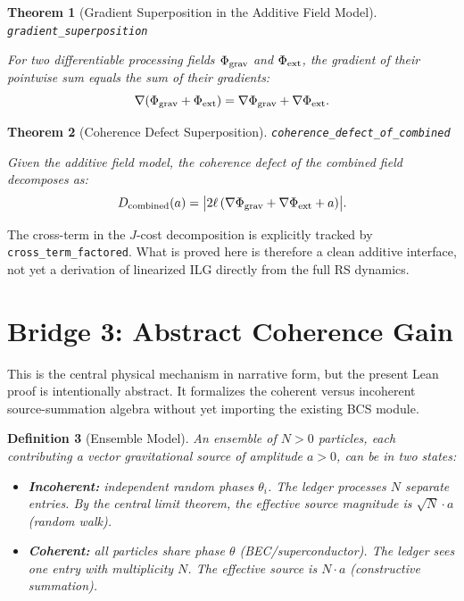 \documentclass[11pt,a4paper]{article}
\newtheorem{theorem}{Theorem}[section]
\newtheorem{definition}[theorem]{Definition}
\newcommand{\lean}[1]{\texttt{\small #1}}
\begin{document}
\begin{theorem}[Gradient Superposition in the Additive Field Model]
\label{thm:gap2}
\lean{gradient\_superposition}

For two differentiable processing fields $\Phi_{\rm grav}$ and $\Phi_{\rm ext}$, the gradient of their pointwise sum equals the sum of their gradients:
\begin{equation}
    \nabla(\Phi_{\rm grav} + \Phi_{\rm ext}) = \nabla\Phi_{\rm grav} + \nabla\Phi_{\rm ext}.
\end{equation}
\end{theorem}

\begin{theorem}[Coherence Defect Superposition]
\lean{coherence\_defect\_of\_combined}

Given the additive field model, the coherence defect of the combined field decomposes as:
\begin{equation}
    D_{\rm combined}(a) = \bigl|2\ell\,(\nabla\Phi_{\rm grav} + \nabla\Phi_{\rm ext} + a)\bigr|.
\end{equation}
\end{theorem}

The cross-term in the $J$-cost decomposition is explicitly tracked by
\lean{cross\_term\_factored}.
What is proved here is therefore a clean additive interface, not yet a derivation of linearized ILG directly from the full RS dynamics.

\section{Bridge 3: Abstract Coherence Gain}
\label{sec:gap3}

This is the central physical mechanism in narrative form, but the present Lean proof is intentionally abstract.
It formalizes the coherent versus incoherent source-summation algebra without yet importing the existing BCS module.

\begin{definition}[Ensemble Model]
An \emph{ensemble} of $N > 0$ particles, each contributing a vector gravitational source of amplitude $a > 0$, can be in two states:
\begin{itemize}
    \item \textbf{Incoherent:} independent random phases $\theta_i$.  The ledger processes $N$ separate entries.  By the central limit theorem, the effective source magnitude is $\sqrt{N} \cdot a$ (random walk).
    \item \textbf{Coherent:} all particles share phase $\theta$ (BEC/superconductor).  The ledger sees one entry with multiplicity $N$.  The effective source is $N \cdot a$ (constructive summation).
\end{itemize}
\end{definition}
\end{document}
